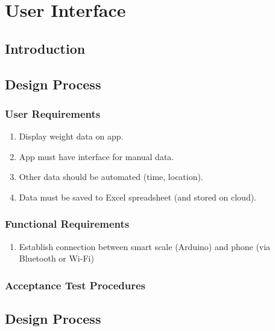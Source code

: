 \documentclass[class=report,11pt,crop=false]{standalone}
\begin{document}
	\chapter{User Interface \label{ch:user-interface}}
	
	\vspace{0.5cm}
	
	\section{Introduction}
	
	\section{Design Process}
		\subsection{User Requirements}
		\begin{enumerate}
			\item Display weight data on app.
			\item App must have interface for manual data.
			\item Other data should be automated (time, location).
			\item Data must be saved to Excel spreadsheet (and stored on cloud).
			
		\end{enumerate}
		
		\subsection{Functional Requirements}
		\begin{enumerate}
			\item Establish connection between smart scale (Arduino) and phone (via Bluetooth or Wi-Fi) 
		\end{enumerate}
			
			
		
		\subsection{Acceptance Test Procedures}
	
	\section{Design Process}
		
\end{document}
